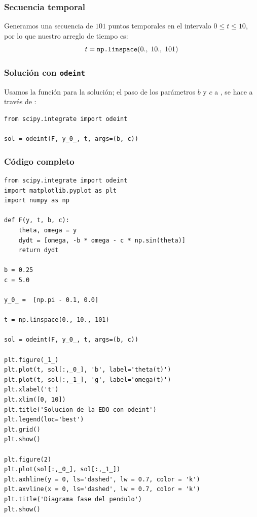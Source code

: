 \begin{frame}
\frametitle{Secuencia temporal}
Generamos una secuencia de $101$ puntos temporales en el intervalo $0 \leq t \leq 10$, por lo que nuestro arreglo de tiempo es:
\[ t =  \mbox{\texttt{np.linspace}}(0., \; 10., \; 101)\]
\end{frame}
\begin{frame}[fragile]
\frametitle{Solución con \texttt{odeint}}
Usamos la función  para la solución; el paso de los parámetros $b$ y $c$ a , se hace a través de :
\begin{lstlisting}[caption=Solución con odeint, style=FormattedNumber, basicstyle=\linespread{1.1}\ttfamily=\small, columns=fullflexible]
from scipy.integrate import odeint

sol = odeint(F, y_0_, t, args=(b, c))
\end{lstlisting}
\end{frame}
\begin{frame}
\frametitle{Código completo}
\begin{lstlisting}[caption=Función a integrar, style=FormattedNumber, basicstyle=\linespread{1.1}\ttfamily=\small, columns=fullflexible]
from scipy.integrate import odeint
import matplotlib.pyplot as plt
import numpy as np

def F(y, t, b, c):
    theta, omega = y
    dydt = [omega, -b * omega - c * np.sin(theta)]
    return dydt

b = 0.25
c = 5.0

y_0_ =  [np.pi - 0.1, 0.0]

t = np.linspace(0., 10., 101)

sol = odeint(F, y_0_, t, args=(b, c))

plt.figure(_1_)
plt.plot(t, sol[:,_0_], 'b', label='theta(t)')
plt.plot(t, sol[:,_1_], 'g', label='omega(t)')
plt.xlabel('t')
plt.xlim([0, 10])
plt.title('Solucion de la EDO con odeint')
plt.legend(loc='best')
plt.grid()
plt.show()

plt.figure(2)
plt.plot(sol[:,_0_], sol[:,_1_])
plt.axhline(y = 0, ls='dashed', lw = 0.7, color = 'k')
plt.axvline(x = 0, ls='dashed', lw = 0.7, color = 'k')
plt.title('Diagrama fase del pendulo')
plt.show()
\end{lstlisting}
\end{frame}
